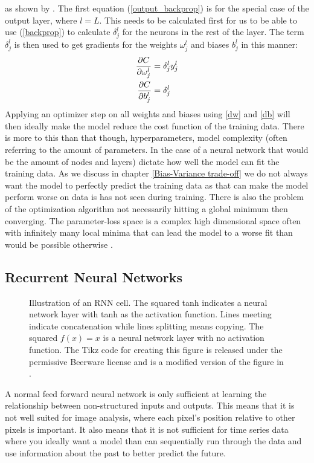 as shown by \citet{fysstkweek40}.
The first equation (\ref{output_backprop}) is for the special case of the output 
layer, where $l=L$. This needs to be calculated first for us to be able to use 
(\ref{backprop}) to calculate $\delta^l_j$ for the neurons in the rest of the layer. 
The term $\delta^l_j$ is then used to get gradients for the weights $\omega^l_j$ 
and biases $b^l_j$ in this manner:
\begin{align}
    \pdv{C}{\omega^l_j} &= \delta^l_j y^l_j \label{dw}\\
    \pdv{C}{b^l_j} &= \delta^l_j \label{db}
\end{align}
Applying an optimizer step on all weights and biases using \ref{dw} and \ref{db}
will then ideally make the model reduce the cost function of the training data.
There is more to this than that though, hyperparameters, model complexity (often 
referring to the amount of parameters. In the case of a neural network that would 
be the amount of nodes and layers) dictate how well the model can fit the training 
data. As we discuss in chapter \ref{Bias-Variance trade-off} we do not always want 
the model to perfectly predict the training data as that can make the model perform 
worse on data is has not seen during training. There is also the problem of the 
optimization algorithm not necessarily hitting a global minimum then converging. 
The parameter-loss space is a complex high dimensional space often with infinitely 
many local minima that can lead the model to a worse fit than would be possible 
otherwise \citep{elemstatlearn}.
\subsection{Recurrent Neural Networks}
\label{RNN Theory}
\begin{figure}
    
    \caption[An RNN cell.]{Illustration of an RNN cell. The squared tanh indicates a neural 
    network layer with tanh as the activation function. Lines meeting indicate 
    concatenation while lines splitting means copying. 
	The squared $f(x)=x$ is a neural network layer with no activation function.
The Tikz code for creating this figure is released under the permissive Beerware license 
    and is a modified version of the figure in \citet{tikzlstm}.}
	\label{RNN figure}
\end{figure}
A normal feed forward neural network is only sufficient at learning the relationship 
between non-structured inputs and outputs. This means that it is not well suited 
for image analysis, where each pixel's position relative to other pixels is important. 
It also means that it is not sufficient for time series data where you ideally 
want a model than can sequentially run through the data and use information about 
the past to better predict the future.

